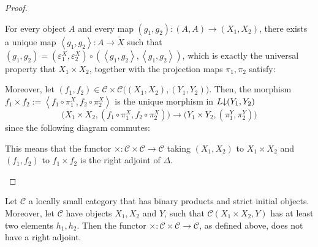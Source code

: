 \begin{proof}
\begin{itemize}
For every object $A$ and every map $(g_1,g_2):(A,A)\to(X_1,X_2)$, there exists a unique map $\left<g_1,g_2\right>:A\to\tilde{X}$ such that $(g_1,g_2)=(\varepsilon^X_1,\varepsilon^X_2)\circ(\left<g_1,g_2\right>,\left<g_1,g_2\right>)$, which is exactly the universal property that $X_1\times X_2$, together with the projection maps $\pi_1,\pi_2$ satisfy:
\begin{center}
\end{center}
Moreover, let $(f_1,f_2)\in\mathcal{C}\times\mathcal{C}\big((X_1,X_2),(Y_1,Y_2)\big)$. Then, the morphism $f_1\times f_2:=\left<f_1\circ\pi^X_1,f_2\circ\pi^X_2\right>$ is the unique morphism in $L\mkern-5mu\downarrow\mkern-5mu (Y_1,Y_2)$
\[\big(X_1\times X_2,(f_1\circ\pi^X_1,f_2\circ\pi^X_2)\big)\to\big(Y_1\times Y_2,(\pi^Y_1,\pi^Y_2)\big)\]
since the following diagram commutes:
\begin{center}
\end{center}
This means that the functor $\times:\mathcal{C}\times\mathcal{C}\to\mathcal{C}$ taking $(X_1,X_2)$ to $X_1\times X_2$ and $(f_1,f_2)$ to $f_1\times f_2$ is the right adjoint of $\Delta$.\qedhere
\end{itemize}
\end{proof}
\begin{example} Let $\mathcal{C}$ a locally small category that has binary products and strict initial objects. Moreover, let $\mathcal{C}$ have objects $X_1,X_2$ and $Y$, such that $\mathcal{C}(X_1\times X_2,Y)$ has at least two elements $h_1,h_2$. Then the functor $\times:\mathcal{C}\times\mathcal{C}\to\mathcal{C}$, as defined above, does not have a right adjoint.
\end{example}

